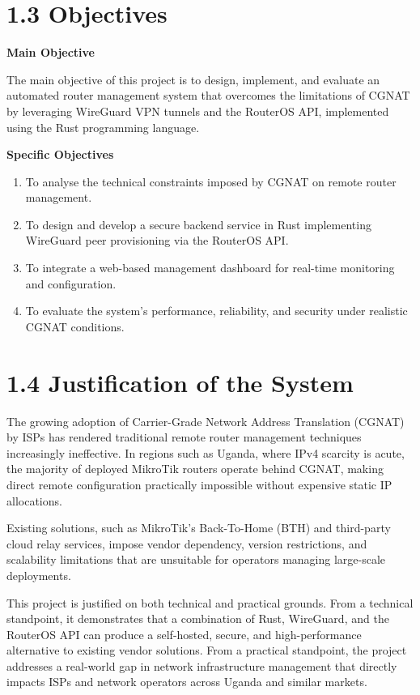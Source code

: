 \documentclass[12pt,a4paper,oneside]{report}
\begin{document}
\section{1.3 Objectives}

\textbf{Main Objective}

The main objective of this project is to design, implement, and evaluate an automated router management system that overcomes the limitations of CGNAT by leveraging WireGuard VPN tunnels and the RouterOS API, implemented using the Rust programming language.

\textbf{Specific Objectives}

\begin{enumerate}
  \item To analyse the technical constraints imposed by CGNAT on remote router management.
  \item To design and develop a secure backend service in Rust implementing WireGuard peer provisioning via the RouterOS API.
  \item To integrate a web-based management dashboard for real-time monitoring and configuration.
  \item To evaluate the system's performance, reliability, and security under realistic CGNAT conditions.
\end{enumerate}

\section{1.4 Justification of the System}

The growing adoption of Carrier-Grade Network Address Translation (CGNAT) by ISPs has rendered traditional remote router management techniques increasingly ineffective. In regions such as Uganda, where IPv4 scarcity is acute, the majority of deployed MikroTik routers operate behind CGNAT, making direct remote configuration practically impossible without expensive static IP allocations.

Existing solutions, such as MikroTik's Back-To-Home (BTH) and third-party cloud relay services, impose vendor dependency, version restrictions, and scalability limitations that are unsuitable for operators managing large-scale deployments.

This project is justified on both technical and practical grounds. From a technical standpoint, it demonstrates that a combination of Rust, WireGuard, and the RouterOS API can produce a self-hosted, secure, and high-performance alternative to existing vendor solutions. From a practical standpoint, the project addresses a real-world gap in network infrastructure management that directly impacts ISPs and network operators across Uganda and similar markets.
\end{document}
